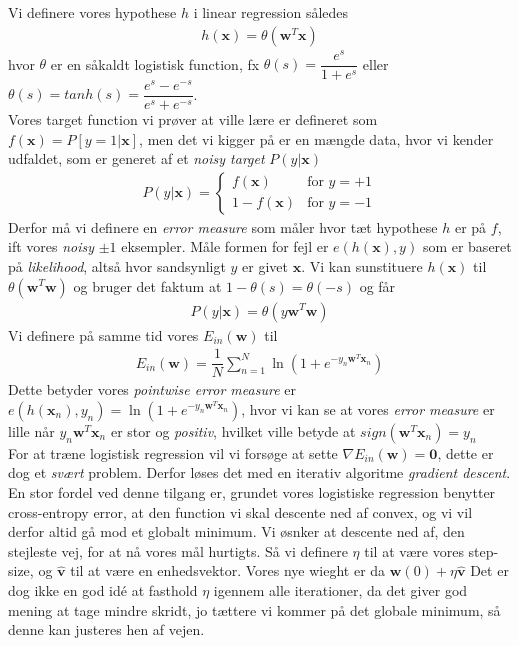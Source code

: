 \documentclass[paper=a4, fontsize=11pt]{scrartcl} %
\numberwithin{equation}{section} %
\numberwithin{figure}{section} %
\numberwithin{table}{section} %
\begin{document}
	Vi definere vores hypothese $h$ i linear regression således 
	\begin{align*}
	h(\mathbf{x})=\theta(\mathbf{w}^T\mathbf{x})
	\end{align*}
	hvor $\theta$ er en såkaldt logistisk function, fx $\theta(s)=\dfrac{e^s}{1+e^s}$ eller $\theta(s)=tanh(s)=\dfrac{e^s-e^{-s}}{e^s+e^{-s}}$. \\
	
	Vores target function vi prøver at ville lære er defineret som $f(\mathbf{x})=P[y=1|\mathbf{x}]$, men det vi kigger på er en mængde data, hvor vi kender udfaldet, som er generet af et \textit{noisy target} $P(y|\mathbf{x})$
	\begin{align*}
	P(y|\mathbf{x})=\begin{cases}
	f(\mathbf{x}) & \text{for } y=+1 \\
	1-f(\mathbf{x}) & \text{for } y=-1
	\end{cases}
	\end{align*}
	Derfor må vi definere en \textit{error measure} som måler hvor tæt hypothese $h$ er på $f$, ift vores \textit{noisy} $\pm1$ eksempler. Måle formen for fejl er $e(h(\mathbf{x}),y)$ som er baseret på \textit{likelihood}, altså hvor sandsynligt $y$ er givet $\mathbf{x}$. Vi kan sunstituere $h(\mathbf{x})$ til $\theta(\mathbf{w}^T\mathbf{w})$ og bruger det faktum at $1-\theta(s)=\theta(-s)$ og får
	\begin{align*}
	P(y|\mathbf{x})=\theta(y\mathbf{w}^T\mathbf{w})
	\end{align*}
	Vi definere på samme tid vores $E_{in}(\mathbf{w})$ til
	\begin{align*}
	E_{in}(\mathbf{w})=\dfrac{1}{N}\sum_{n=1}^{N}\ln\left(1+e^{-y_n\mathbf{w}^T\mathbf{x}_n}\right)
	\end{align*}
	Dette betyder vores \textit{pointwise error measure} er $e(h(\mathbf{x}_n),y_n)=\ln(1+e^{-y_n\mathbf{w}^T\mathbf{x}_n})$, hvor vi kan se at vores \textit{error measure} er lille når $y_n\mathbf{w}^T\mathbf{x}_n$ er stor og \textit{positiv}, hvilket ville betyde at $sign(\mathbf{w}^T\mathbf{x}_n)=y_n$ \\
	
	For at træne logistisk regression vil vi forsøge at sette $\nabla E_{in}(\mathbf{w})=\mathbf{0}$, dette er dog et \textit{svært} problem. Derfor løses det med en iterativ algoritme \textit{gradient descent}. En stor fordel ved denne tilgang er, grundet vores logistiske regression benytter cross-entropy error, at den function vi skal descente ned af convex, og vi vil derfor altid gå mod et globalt minimum. Vi øsnker at descente ned af, den stejleste vej, for at nå vores mål hurtigts. Så vi definere $\eta$ til at være vores step-size, og $\hat{\mathbf{v}}$ til at være en enhedsvektor. Vores nye wieght er da $\mathbf{w}(0)+\eta\hat{\mathbf{v}}$ Det er dog ikke en god idé at fasthold $\eta$ igennem alle iterationer, da det giver god mening at tage mindre skridt, jo tættere vi kommer på det globale minimum, så denne kan justeres hen af vejen. \\
	
\end{document}
